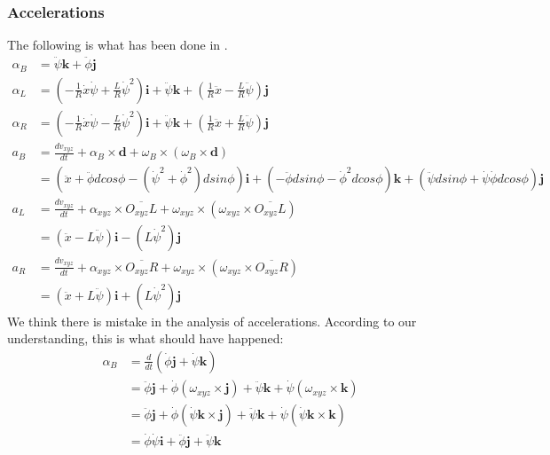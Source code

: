 \documentclass[a4paper,10pt]{article}
\begin{document}
\subsubsection{Accelerations}
The following is what has been done in \cite{kim2005dynamic}.
\begin{align}
 \alpha_B &= \ddot\psi \mathbf{k} + \ddot\phi\mathbf{j} \\
 \alpha_L &= \left(-\frac{1}{R} \dot{x} \dot\psi + \frac{L}{R}\dot\psi^2 \right) \mathbf{i} + \ddot\psi \mathbf{k} + \left( \frac{1}{R} \ddot{x} - \frac{L}{R}\ddot\psi \right) \mathbf{j} \\
 \alpha_R &= \left(-\frac{1}{R} \dot{x} \dot\psi - \frac{L}{R}\dot\psi^2 \right) \mathbf{i} + \ddot\psi \mathbf{k} + \left( \frac{1}{R} \ddot{x} + \frac{L}{R}\ddot\psi \right) \mathbf{j} \\
 a_B      &= \frac{d v_{xyz}}{dt} + \alpha_B \times \mathbf{d} + \omega_B \times (\omega_B \times \mathbf{d})\\
          &= \left(\ddot{x} + \ddot\phi dcos\phi - (\dot\psi^2 + \dot\phi^2)dsin\phi\right) \mathbf{i} 
             + \left( -\ddot\phi dsin\phi - \dot\phi^2dcos\phi\right) \mathbf{k} + \left( \ddot\psi dsin\phi + \dot\psi\dot\phi dcos\phi\right) \mathbf{j} \\
 a_L      &= \frac{d v_{xyz}}{dt} + \alpha_{xyz} \times \overline{O_{xyz}L} + \omega_{xyz} \times (\omega_{xyz} \times \overline{O_{xyz}L}) \\
          &= (\ddot{x}-L\ddot\psi) \mathbf{i} - (L\dot\psi^2)\mathbf{j} \\
 a_R      &= \frac{d v_{xyz}}{dt} + \alpha_{xyz} \times \overline{O_{xyz}R} + \omega_{xyz} \times (\omega_{xyz} \times \overline{O_{xyz}R}) \\
          &= (\ddot{x}+L\ddot\psi) \mathbf{i} + (L\dot\psi^2)\mathbf{j} 
\end{align}
We think there is mistake in the analysis of accelerations. According to our understanding, this is what should have happened:
\begin{align}
 \alpha_B &= \frac{d}{dt}\left( \dot\phi\mathbf{j} + \dot{\psi}\mathbf{k} \right) \\
          &= \ddot\phi\mathbf{j} + \dot\phi(\omega_{xyz} \times \mathbf{j}) + \ddot{\psi}\mathbf{k} + \dot\psi(\omega_{xyz} \times \mathbf{k}) \\
          &= \ddot\phi\mathbf{j} + \dot\phi(\dot\psi \mathbf{k} \times \mathbf{j}) + \ddot{\psi}\mathbf{k} + \dot\psi(\dot\psi \mathbf{k} \times \mathbf{k}) \\
          &= \dot\phi\dot\psi \mathbf{i} + \ddot\phi\mathbf{j} + \ddot{\psi}\mathbf{k} \\
          
\end{align}
\end{document}
